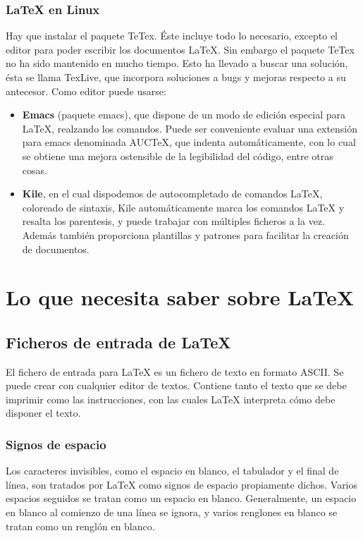				\subsubsection{\LaTeX{} en Linux} 
				Hay que instalar el paquete TeTex. \'Este incluye todo lo necesario, excepto el editor para poder escribir 
				los documentos LaTeX. Sin embargo el paquete TeTex no ha sido mantenido en mucho tiempo. Esto ha llevado a buscar 
				una soluci\'on, \'esta se llama TexLive, que incorpora soluciones a bugs y mejoras respecto a su antecesor.
				Como editor puede usarse:
			
	\begin{itemize}
	\item \textbf{Emacs} (paquete emacs), que dispone de un modo de edici\'on especial para \LaTeX{}, realzando 
	los comandos. Puede ser conveniente evaluar una extensi\'on para emacs denominada AUCTeX, que indenta 
	autom\'aticamente, con lo cual se obtiene una mejora ostensible de la legibilidad del c\'odigo, entre 
	otras cosas.
	\item \textbf{Kile}, en el cual dispodemos de autocompletado de comandos \LaTeX{}, coloreado de sintaxis, 
	Kile autom\'aticamente marca los comandos \LaTeX{} y resalta los parentesis, y puede trabajar 
	con m\'ultiples ficheros a la vez. Adem\'as tambi\'en proporciona plantillas y patrones para facilitar 
	la creaci\'on de documentos.
	\end{itemize}
			
			
\section{Lo que necesita saber sobre \LaTeX{}}%
		
		\subsection{Ficheros de entrada de \LaTeX{}}
		El fichero de entrada para \LaTeX{} es un fichero de texto en formato ASCII. Se puede crear con cualquier editor 
		de textos. Contiene tanto el texto que se debe imprimir como las instrucciones, con las cuales \LaTeX{} interpreta 
		c\'omo debe disponer el texto. 
				
				\subsubsection{Signos de espacio}
				Los caracteres invisibles, como el espacio en blanco, el tabulador y el final de l\'inea, son tratados por 
				\LaTeX{} como signos de espacio propiamente dichos. Varios espacios seguidos se tratan como un espacio en 
				blanco. Generalmente, un espacio en blanco al comienzo de una l\'inea se ignora, y varios renglones en blanco 
				se tratan como un rengl\'on en blanco. 

